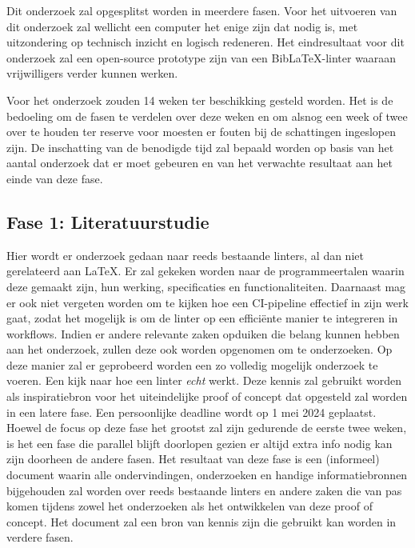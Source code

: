 Dit onderzoek zal opgesplitst worden in meerdere fasen. Voor het uitvoeren van dit onderzoek zal wellicht een computer het enige zijn dat nodig is, met uitzondering op technisch inzicht en logisch redeneren.
Het eindresultaat voor dit onderzoek zal een open-source prototype zijn van een BibLaTeX-linter waaraan vrijwilligers verder kunnen werken. \newline

Voor het onderzoek zouden 14 weken ter beschikking gesteld worden. Het is de bedoeling om de fasen te verdelen over deze weken en om alsnog een week of twee over te houden ter 
reserve voor moesten er fouten bij de schattingen ingeslopen zijn.
De inschatting van de benodigde tijd zal bepaald worden op basis van het aantal onderzoek dat er moet gebeuren en van het verwachte resultaat aan het einde van deze fase. 

\subsection{Fase 1: Literatuurstudie}
Hier wordt er onderzoek gedaan naar reeds bestaande linters, al dan niet gerelateerd aan LaTeX. Er zal gekeken worden naar de programmeertalen waarin deze gemaakt zijn, hun werking, specificaties en functionaliteiten. Daarnaast mag er ook niet vergeten worden om te kijken hoe een CI-pipeline effectief in zijn werk gaat, zodat het mogelijk is om de linter op een efficiënte manier te integreren in workflows.
Indien er andere
 relevante zaken opduiken die belang kunnen hebben aan het onderzoek, zullen deze ook worden opgenomen om te onderzoeken. Op deze manier zal er geprobeerd worden een zo volledig mogelijk onderzoek te voeren. 
Een kijk naar hoe een linter \emph{echt} werkt. Deze kennis zal gebruikt worden als inspiratiebron voor het uiteindelijke proof of concept dat opgesteld zal worden in een latere fase. 
Een persoonlijke deadline wordt op 1 mei 2024 geplaatst. Hoewel de focus op deze fase het grootst zal zijn gedurende de eerste twee weken, is het een fase die parallel blijft doorlopen gezien er altijd extra info nodig kan zijn doorheen de andere fasen.
Het resultaat van deze fase is een (informeel) document waarin alle ondervindingen, onderzoeken en handige informatiebronnen bijgehouden zal worden over reeds bestaande linters en andere zaken die van pas komen tijdens zowel het onderzoeken als het ontwikkelen van deze proof of concept. Het document zal een bron van kennis zijn die gebruikt kan worden in verdere fasen.

